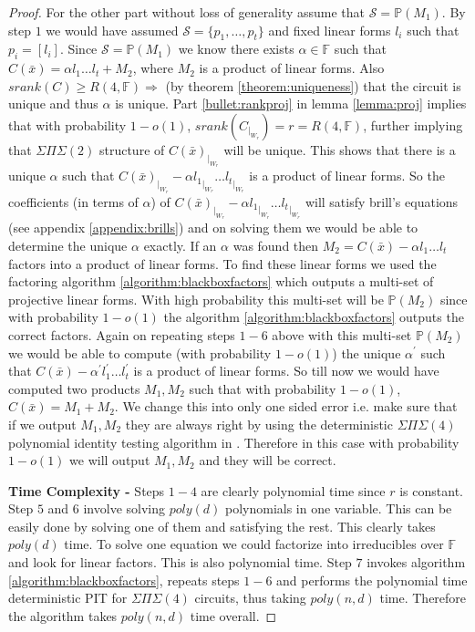 \documentclass[12pt]{caltech_thesis}
\theoremstyle{plain}
\theoremstyle{definition}
\newcommand{\F}{\mathbb{F}}
\newcommand{\MS}{\mathcal{S}}
\newcommand{\PP}{\mathbb{P}}
\newcommand{\B}[1]{\bar{#1}}
\begin{document}
\begin{proof}
For the other part without loss of generality assume that $\MS = \PP(M_1)$.
By step $1$ we would have assumed $\MS = \{p_1,\ldots,p_t\}$ and fixed linear forms $l_i$ such that $p_i=[l_i]$.
Since $\MS = \PP(M_1)$ we know there exists $\alpha\in \F$ such that $C(\B{x}) = \alpha l_1 \ldots l_t + M_2$,  
where $M_2$ is a product of linear forms. Also $srank(C) \geq R(4,\F) \Rightarrow$ (by theorem \ref{theorem:uniqueness}) that the 
circuit is unique and thus $\alpha$ is unique.
Part \ref{bullet:rankproj} in lemma \ref{lemma:proj} implies that with probability $1-o(1)$, $srank(C_{|_{W_r}})=r = R(4,\F)$, further implying that 
 $\Sigma\Pi\Sigma(2)$ structure of $C(\B{x})_{|_{W_r}}$ will be unique. This shows that there is a unique $\alpha$ such that  
$C(\B{x})_{|_{W_r}}- \alpha {l_1}_{|_{W_r}}\ldots {l_t}_{|_{W_r}}$ is a product of linear forms. 
So the coefficients (in terms of $\alpha$) of $C(\B{x})_{|_{W_r}}-\alpha{l_1}_{|_{W_r}}\ldots {l_t}_{|_{W_r}}$ will satisfy 
brill's equations (see appendix \ref{appendix:brills}) and on solving them we would be able to determine the unique $\alpha$ exactly. 
If an $\alpha$ was found then $M_2 = C(\B{x}) - \alpha l_1\ldots l_t$ factors into a product of linear forms. To find these linear forms  
we used the factoring algorithm \ref{algorithm:blackboxfactors} which outputs a multi-set of projective linear forms. With high probability 
this multi-set will be $\PP(M_2)$ since with probability $1-o(1)$ the algorithm \ref{algorithm:blackboxfactors} outputs the correct factors.
Again on repeating steps $1-6$ above with this multi-set $\PP(M_2)$ we would be able to compute (with probability $1-o(1)$) 
the unique $\alpha^\prime$ such that $C(\B{x}) - \alpha^\prime l_1^\prime\ldots l_t^\prime$ is a product of linear forms. So till now
we would have computed two products $M_1,M_2$ such that with probability $1-o(1)$, $C(\B{x}) = M_1+M_2$. We change this into only one
sided error i.e. make sure that if we output $M_1,M_2$ they are always right by using the deterministic $\Sigma\Pi\Sigma(4)$ polynomial
identity testing algorithm in \cite{SS10}.
Therefore in this case with probability $1-o(1)$ we will output $M_1,M_2$ and they will be correct.

\textbf{Time Complexity - } Steps $1-4$ are clearly polynomial time since $r$ is constant. Step $5$ and $6$ involve solving $poly(d)$
polynomials in one variable. This can be easily done by solving one of them and satisfying the rest. This clearly takes $poly(d)$ time.
To solve one equation we could factorize into irreducibles over $\F$ and look for linear factors. This is also polynomial time. Step $7$ invokes
algorithm \ref{algorithm:blackboxfactors}, repeats steps $1-6$  and performs the polynomial time deterministic PIT for $\Sigma\Pi\Sigma(4)$
circuits, thus taking $poly(n,d)$ time. Therefore the algorithm takes $poly(n,d)$ time overall.


\end{proof}
\end{document}
